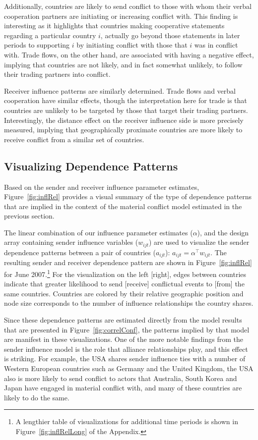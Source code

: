 Additionally, countries are likely to send conflict to those with whom their verbal cooperation partners are initiating or increasing conflict with. This finding is interesting as it highlights that countries making cooperative statements regarding a particular country $i$, actually go beyond those statements in later periods to supporting $i$ by initiating conflict with those that $i$ was in conflict with. Trade flows, on the other hand, are associated with having a negative effect, implying that countries are not likely, and in fact somewhat unlikely, to follow their trading partners into conflict.

Receiver influence patterns are similarly determined. Trade flows and verbal cooperation have similar effects, though the interpretation here for trade is that countries are unlikely to be targeted by those that target their trading partners. Interestingly, the distance effect on the receiver influence side is more precisely measured, implying that geographically proximate countries are more likely to receive conflict from a similar set of countries.

\subsection*{Visualizing Dependence Patterns}

Based on the sender and receiver influence parameter estimates, Figure~\ref{fig:inflRel} provides a visual summary of the type of dependence patterns that are implied in the context of the material conflict model estimated in the previous section.

The linear combination of our influence parameter estimates ($\alpha$), and the design array containing sender influence variables ($w_{ijt}$) are used to visualize the sender dependence patterns between a pair of countries ($a_{ijt}$): $a_{ijt} = \alpha^{\top} w_{ijt}$. The resulting sender and receiver dependence pattern are shown in Figure~\ref{fig:inflRel} for June 2007.\footnote{A lengthier table of visualizations for additional time periods is shown in Figure~\ref{fig:inflRelLong} of the Appendix.} For the visualization on the left [right], edges between countries indicate that greater likelihood to send [receive] conflictual events to [from] the same countries. Countries are colored by their relative geographic position and node size corresponds to the number of influence relationships the country shares.

Since these dependence patterns are estimated directly from the model results that are presented in Figure~\ref{fig:correlConf}, the patterns implied by that model are manifest in these visualizations. One of the more notable findings from the sender influence model is the role that alliance relationships play, and this effect is striking. For example, the USA shares sender influence ties with a number of Western European countries such as Germany and the United Kingdom, the USA also is more likely to send conflict to actors that Australia, South Korea and Japan have engaged in material conflict with, and many of these countries are likely to do the same.

